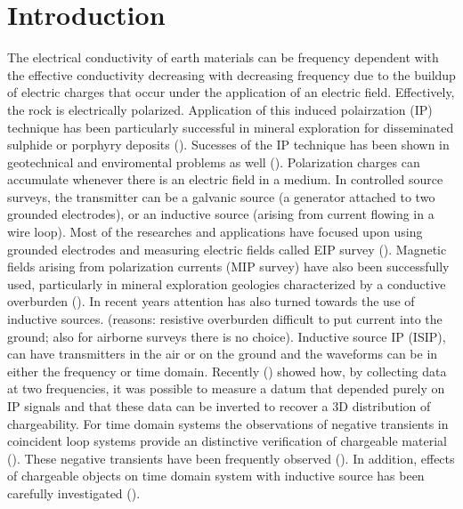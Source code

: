 \documentclass[extra,mreferee]{gji}
\begin{document}
\linenumbers
\section{Introduction}
The electrical conductivity of earth materials can be frequency dependent with the effective conductivity decreasing with decreasing frequency due to the buildup of electric charges that occur under the application of an electric field.
Effectively, the rock is electrically polarized. 
Application of this induced polairzation (IP) technique has been particularly successful in mineral exploration for disseminated sulphide or porphyry deposits (\cite{Pelton1978, Fink1990}). Sucesses of the IP technique has been shown in geotechnical and enviromental problems as well (\cite{Kemna2012}). 
Polarization charges can accumulate whenever there is an electric field in a medium. In controlled source surveys, the transmitter can be a galvanic source (a generator attached to two grounded electrodes), or an inductive source (arising from current flowing in a wire loop). Most of the researches and applications have focused upon using grounded electrodes and measuring electric fields called EIP survey (\cite{seigel1959}). Magnetic fields arising from polarization currents (MIP survey) have also been successfully used, particularly in mineral exploration geologies characterized by a conductive overburden (\cite{seigel1974}). In recent years attention has also turned towards the use of inductive sources. (reasons:  resistive overburden difficult to put current into the ground; also for airborne surveys there is no choice).  Inductive source IP (ISIP), can have transmitters in the air or on the ground and the waveforms can be in either the frequency or time domain. Recently  (\cite{Marchant2012b}) showed how, by collecting data at two frequencies, it was possible to measure a datum that depended purely on IP signals and that these data can be inverted to recover a 3D distribution of chargeability. 
For time domain systems the observations of negative transients in coincident loop systems provide an distinctive verification of chargeable material (\cite{Weidelt1982}). These negative transients have been frequently observed (\cite{SmithandKlein,Kratzer2012,Kang2015a}). In addition, effects of chargeable objects on time domain system with inductive source has been carefully investigated (\cite{Smith1988a,Flis1989,ElKaliouby2004, Marchant2014}). 
\end{document}
